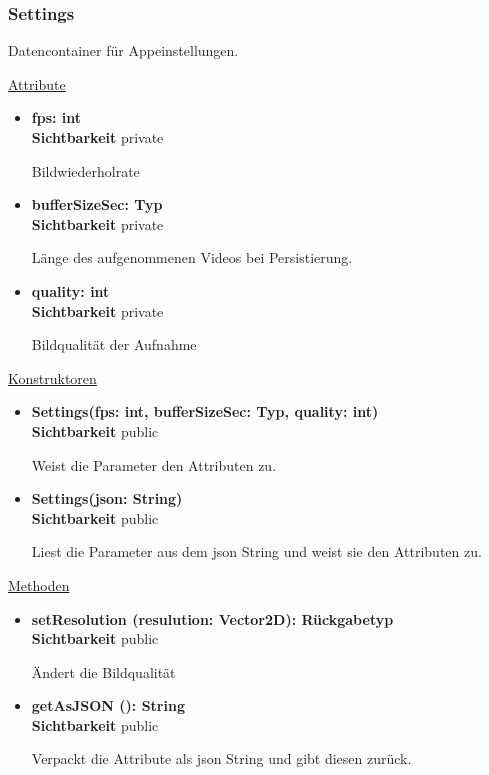 \subsubsection{Settings} \label{app:klasse:Settings}
Datencontainer für Appeinstellungen. \newline

\underline{Attribute}
\begin{itemize}
\itemsep0pt
\item \textbf{fps: int} \hfill\\ 
\textbf{Sichtbarkeit} private

Bildwiederholrate

\item \textbf{bufferSizeSec: Typ} \hfill\\ 
\textbf{Sichtbarkeit} private

Länge des aufgenommenen Videos bei Persistierung.

\item \textbf{quality: int} \hfill\\ 
\textbf{Sichtbarkeit} private

Bildqualität der Aufnahme

\end{itemize}

\underline{Konstruktoren}
\begin{itemize}
\itemsep0pt
\item \textbf{Settings(fps: int, bufferSizeSec: Typ, quality: int)} \hfill\\
\textbf{Sichtbarkeit} public

Weist die Parameter den Attributen zu.

\item \textbf{Settings(json: String)} \hfill\\
\textbf{Sichtbarkeit} public

Liest die Parameter aus dem json String und weist sie den Attributen zu.
\end{itemize}

\underline{Methoden}
\begin{itemize}
\itemsep0pt
\item \textbf{setResolution (resulution: Vector2D): Rückgabetyp}\hfill\\
\textbf{Sichtbarkeit} public

Ändert die Bildqualität

\item \textbf{getAsJSON (): String}\hfill\\
\textbf{Sichtbarkeit} public

Verpackt die Attribute als json String und gibt diesen zurück.

\end{itemize}